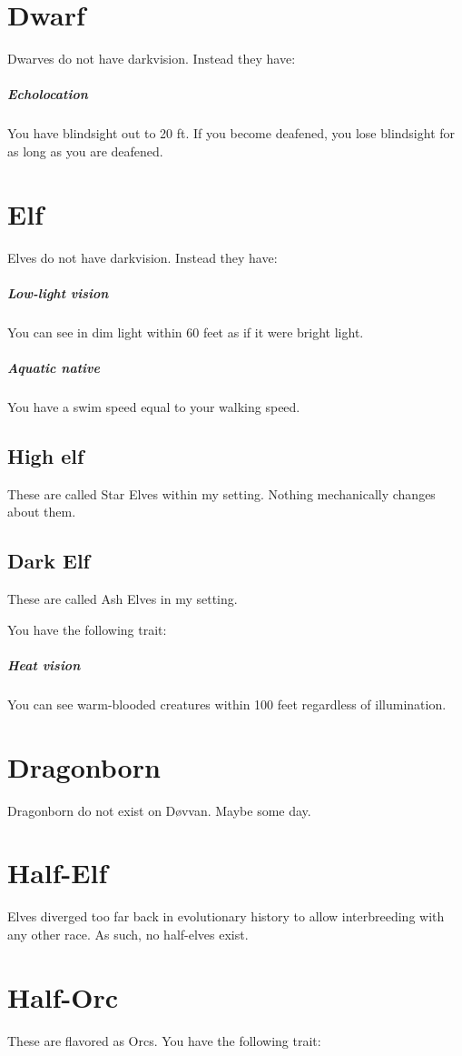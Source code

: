 \section{Dwarf}
Dwarves do not have darkvision.
Instead they have:

\subparagraph{Echolocation}
You have blindsight out to 20 ft.
If you become deafened, you lose blindsight for as long as you are deafened.


\section{Elf}
Elves do not have darkvision.
Instead they have:

\subparagraph{Low-light vision}
You can see in dim light within 60 feet as if it were bright light.

\subparagraph{Aquatic native}
You have a swim speed equal to your walking speed.

\subsection{High elf}
These are called Star Elves within my setting.
Nothing mechanically changes about them.

\subsection{Dark Elf}
These are called Ash Elves in my setting.

You have the following trait:

\subparagraph{Heat vision}
You can see warm-blooded creatures within 100 feet regardless of illumination.


\section{Dragonborn}
Dragonborn do not exist on Døvvan.
Maybe some day.


\section{Half-Elf}
Elves diverged too far back in evolutionary history to allow interbreeding with any other race.
As such, no half-elves exist.


\section{Half-Orc}
These are flavored as Orcs.
You have the following trait:

